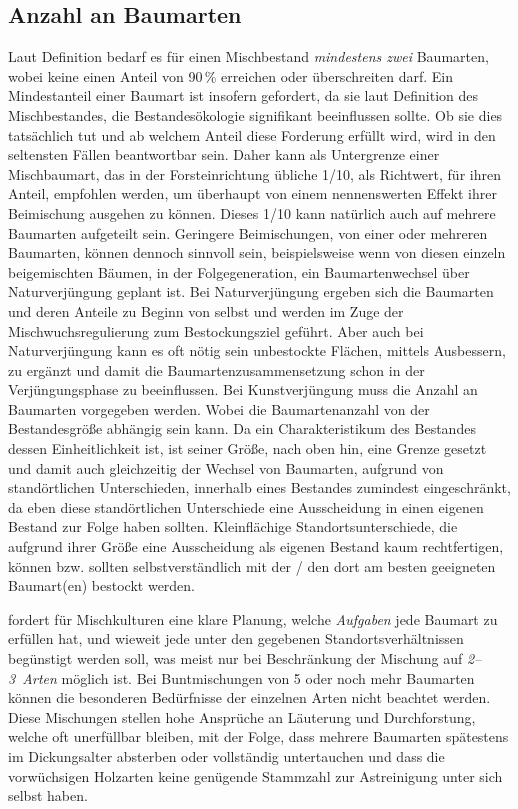 \documentclass[twocolumn]{scrartcl}
\begin{document}
\subsection{Anzahl an Baumarten}
\label{ssec:anzahlBaumarten}

Laut Definition bedarf es für einen Mischbestand \emph{mindestens zwei}
Baumarten, wobei keine einen Anteil von 90\,\% erreichen oder überschreiten
darf. Ein Mindestanteil einer Baumart ist insofern gefordert, da sie laut
Definition des Mischbestandes, die Bestandesökologie signifikant beeinflussen
sollte. Ob sie dies tatsächlich tut und ab welchem Anteil diese Forderung
erfüllt wird, wird in den seltensten Fällen beantwortbar sein. Daher kann als
Untergrenze einer Mischbaumart, das in der Forsteinrichtung übliche 1/10, als
Richtwert, für ihren Anteil, empfohlen werden, um überhaupt von einem
nennenswerten Effekt ihrer Beimischung ausgehen zu können. Dieses 1/10 kann
natürlich auch auf mehrere Baumarten aufgeteilt sein. Geringere Beimischungen,
von einer oder mehreren Baumarten, können dennoch sinnvoll sein, beispielsweise
wenn von diesen einzeln beigemischten Bäumen, in der Folgegeneration, ein
Baumartenwechsel über Naturverjüngung geplant ist. Bei Naturverjüngung ergeben
sich die Baumarten und deren Anteile zu Beginn von selbst und werden im Zuge der
Mischwuchsregulierung zum Bestockungsziel geführt. Aber auch bei Naturverjüngung
kann es oft nötig sein unbestockte Flächen, mittels Ausbessern, zu ergänzt und
damit die Baumartenzusammensetzung schon in der Verjüngungsphase zu
beeinflussen. Bei Kunstverjüngung muss die Anzahl an Baumarten vorgegeben
werden. Wobei die Baumartenanzahl von der Bestandesgröße abhängig sein kann. Da
ein Charakteristikum des Bestandes dessen Einheitlichkeit ist, ist seiner Größe,
nach oben hin, eine Grenze gesetzt und damit auch gleichzeitig der Wechsel von
Baumarten, aufgrund von standörtlichen Unterschieden, innerhalb eines Bestandes
zumindest eingeschränkt, da eben diese standörtlichen Unterschiede eine
Ausscheidung in einen eigenen Bestand zur Folge haben sollten. Kleinflächige
Standortsunterschiede, die aufgrund ihrer Größe eine Ausscheidung als eigenen
Bestand kaum rechtfertigen, können bzw. sollten selbstverständlich mit der / den
dort am besten geeigneten Baumart(en) bestockt werden.

\citet[S.~218\,f.]{wiedemann1951Ertragskunde} fordert für Mischkulturen \frqq
eine klare Planung, welche \emph{Aufgaben} jede Baumart zu erfüllen hat, und
wieweit jede unter den gegebenen Standortsverhältnissen begünstigt werden soll,
was meist nur bei Beschränkung der Mischung auf \emph{2--3~Arten} möglich ist.
Bei Buntmischungen von 5 oder noch mehr Baumarten können die besonderen
Bedürfnisse der einzelnen Arten nicht beachtet werden. Diese Mischungen stellen
hohe Ansprüche an Läuterung und Durchforstung, welche oft unerfüllbar bleiben,
mit der Folge, dass mehrere Baumarten spätestens im Dickungsalter absterben oder
vollständig untertauchen und dass die vorwüchsigen Holzarten keine genügende
Stammzahl zur Astreinigung unter sich selbst haben.\flqq{}
\end{document}
